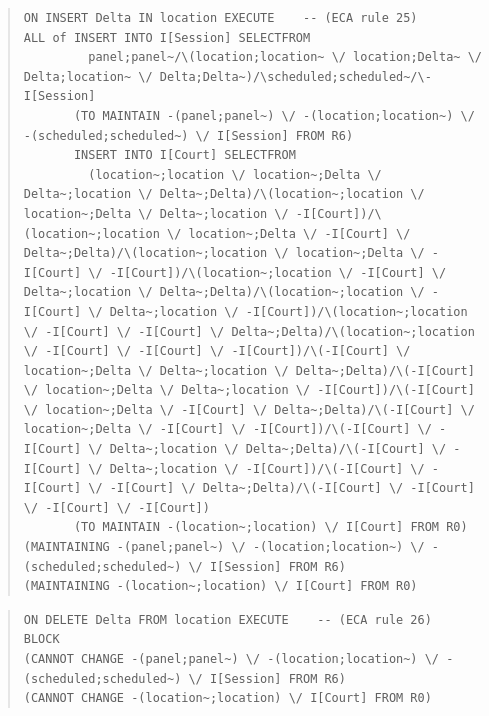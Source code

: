 \documentclass[10pt,a4paper]{report}              %
\theoremstyle{plain}\theorembodyfont{\rmfamily}\newtheorem{definition}{Definition}[section]
\theoremstyle{plain}\theorembodyfont{\rmfamily}\newtheorem{designrule}[definition]{Requirement}
\begin{document}
\begin{quote}
\begin{verbatim}
ON INSERT Delta IN location EXECUTE    -- (ECA rule 25)
ALL of INSERT INTO I[Session] SELECTFROM
         panel;panel~/\(location;location~ \/ location;Delta~ \/ Delta;location~ \/ Delta;Delta~)/\scheduled;scheduled~/\-I[Session]
       (TO MAINTAIN -(panel;panel~) \/ -(location;location~) \/ -(scheduled;scheduled~) \/ I[Session] FROM R6)
       INSERT INTO I[Court] SELECTFROM
         (location~;location \/ location~;Delta \/ Delta~;location \/ Delta~;Delta)/\(location~;location \/ location~;Delta \/ Delta~;location \/ -I[Court])/\(location~;location \/ location~;Delta \/ -I[Court] \/ Delta~;Delta)/\(location~;location \/ location~;Delta \/ -I[Court] \/ -I[Court])/\(location~;location \/ -I[Court] \/ Delta~;location \/ Delta~;Delta)/\(location~;location \/ -I[Court] \/ Delta~;location \/ -I[Court])/\(location~;location \/ -I[Court] \/ -I[Court] \/ Delta~;Delta)/\(location~;location \/ -I[Court] \/ -I[Court] \/ -I[Court])/\(-I[Court] \/ location~;Delta \/ Delta~;location \/ Delta~;Delta)/\(-I[Court] \/ location~;Delta \/ Delta~;location \/ -I[Court])/\(-I[Court] \/ location~;Delta \/ -I[Court] \/ Delta~;Delta)/\(-I[Court] \/ location~;Delta \/ -I[Court] \/ -I[Court])/\(-I[Court] \/ -I[Court] \/ Delta~;location \/ Delta~;Delta)/\(-I[Court] \/ -I[Court] \/ Delta~;location \/ -I[Court])/\(-I[Court] \/ -I[Court] \/ -I[Court] \/ Delta~;Delta)/\(-I[Court] \/ -I[Court] \/ -I[Court] \/ -I[Court])
       (TO MAINTAIN -(location~;location) \/ I[Court] FROM R0)
(MAINTAINING -(panel;panel~) \/ -(location;location~) \/ -(scheduled;scheduled~) \/ I[Session] FROM R6)
(MAINTAINING -(location~;location) \/ I[Court] FROM R0)
\end{verbatim}
\end{quote}
\begin{quote}
\begin{verbatim}
ON DELETE Delta FROM location EXECUTE    -- (ECA rule 26)
BLOCK
(CANNOT CHANGE -(panel;panel~) \/ -(location;location~) \/ -(scheduled;scheduled~) \/ I[Session] FROM R6)
(CANNOT CHANGE -(location~;location) \/ I[Court] FROM R0)
\end{verbatim}
\end{quote}
\end{document}
